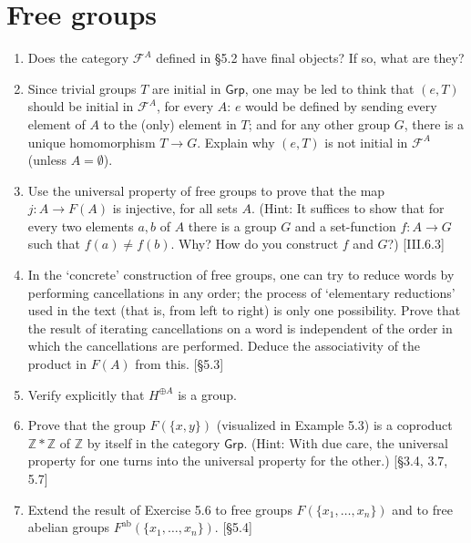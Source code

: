 



\section{Free groups}
\begin{enumerate}
    \item Does the category $\mathscr{F}^A$ defined in \S5.2 have final objects? If so, what are they?

    \item Since trivial groups $T$ are initial in $\mathsf{Grp}$, one may be led to think that $(e, T)$ should be initial in $\mathscr{F}^A$, for every $A$: $e$ would be defined by sending every element of $A$ to the (only) element in $T$; and for any other group $G$, there is a unique homomorphism $T \to G$. Explain why $(e, T)$ is not initial in $\mathscr{F}^A$ (unless $A = \emptyset$).

    \item Use the universal property of free groups to prove that the map $j: A \to F(A)$ is injective, for all sets $A$. (Hint: It suffices to show that for every two elements $a, b$ of $A$ there is a group $G$ and a set-function $f: A \to G$ such that $f(a) \ne f(b)$. Why? How do you construct $f$ and $G$?) [III.6.3]

    \item In the `concrete' construction of free groups, one can try to reduce words by performing cancellations in any order; the process of `elementary reductions' used in the text (that is, from left to right) is only one possibility. Prove that the result of iterating cancellations on a word is independent of the order in which the cancellations are performed. Deduce the associativity of the product in $F(A)$ from this. [\S5.3]

    \item Verify explicitly that $H^{\oplus A}$ is a group.

    \item Prove that the group $F(\{x, y\})$ (visualized in Example 5.3) is a coproduct $\mathbb{Z} \ast \mathbb{Z}$ of $\mathbb{Z}$ by itself in the category $\mathsf{Grp}$. (Hint: With due care, the universal property for one turns into the universal property for the other.) [\S3.4, 3.7, 5.7]

    \item Extend the result of Exercise 5.6 to free groups $F(\{x_1, \dots, x_n\})$ and to free abelian groups $F^{\text{ab}}(\{x_1, \dots, x_n\})$. [\S5.4]


\end{enumerate}
